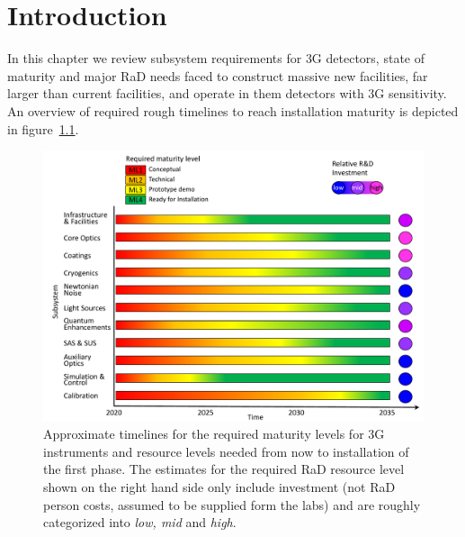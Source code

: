 \chapter{Introduction}
\label{sec:Intro}
\setcounter{page}{1}
In this chapter we review subsystem requirements for \ac{3G} detectors,  state of maturity and major \ac{RaD} needs faced to construct massive new facilities, far larger than current facilities,  and operate in them detectors with \ac{3G} sensitivity.
An overview of required rough timelines to reach installation maturity is depicted in figure~\ref{fig:maturity}. 

\begin{figure}[h]
\centering
\includegraphics*[width= \textwidth]{Figures/3G_Readiness_Levelsblue.pdf}
\caption{Approximate timelines for the required maturity levels for \ac{3G} instruments and resource levels needed from now to installation of the first phase. The estimates for the required \ac{RaD} resource level shown on the right hand side only include investment (not \ac{RaD} person costs, assumed to be supplied form the labs) and are roughly categorized into \textit{low, mid} and \textit{high}.\\
}
\label{fig:maturity}
\end{figure}

